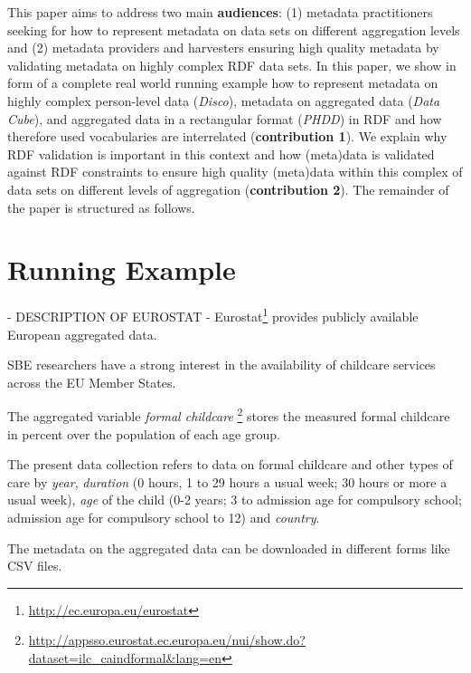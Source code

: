 \documentclass{llncs}
\begin{document}
This paper aims to address two main \textbf{audiences}: 
(1) metadata practitioners seeking for how to represent metadata on data sets on different aggregation levels and
(2) metadata providers and harvesters ensuring high quality metadata by validating metadata on highly complex RDF data sets.
In this paper, we show in form of a complete real world running example how to represent metadata on highly complex person-level data (\emph{Disco}), metadata on aggregated data (\emph{Data Cube}), and aggregated data in a rectangular format (\emph{PHDD}) in RDF and how therefore used vocabularies are interrelated (\textbf{contribution 1}).
We explain why RDF validation is important in this context and how (meta)data is validated against RDF constraints to ensure high quality (meta)data within this complex of data sets on different levels of aggregation (\textbf{contribution 2}). 
The remainder of the paper is structured as follows.

\section{Running Example}

- DESCRIPTION OF EUROSTAT -
Eurostat\footnote{\url{http://ec.europa.eu/eurostat}} provides publicly available European aggregated data.
 
SBE researchers have a strong interest in the availability of childcare services across the EU Member States.

The aggregated variable \emph{formal childcare} \footnote{\url{http://appsso.eurostat.ec.europa.eu/nui/show.do?dataset=ilc_caindformal&lang=en}}
stores the measured formal childcare in percent over the population of each age group.


The present data collection refers to data on formal childcare and other types of care by \emph{year}, \emph{duration} (0 hours, 1 to 29 hours a usual week; 30 hours or more a usual week), \emph{age} of the child (0-2 years; 3 to admission age for compulsory school; admission age for compulsory school to 12) and \emph{country}.

The metadata on the aggregated data can be downloaded in different forms like CSV files.
\end{document}

